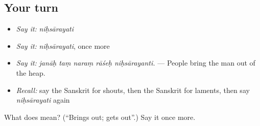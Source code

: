 \subsection*{Your turn}
\begin{itemize}
\raggedright
  \item \emph{Say it:} \emph{niḥsārayati}
  \item \emph{Say it:} \emph{niḥsārayati}, once more
  \item \emph{Say it:} \emph{janāḥ taṃ naraṃ rāśeḥ niḥsārayanti.} — People bring the man out of the heap.
  \item \emph{Recall:} say the Sanskrit for shouts, then the Sanskrit for laments, then say \emph{niḥsārayati} again
\end{itemize}

\begin{tcolorbox}[breakable,colback=teal!4,colframe=teal!35!black,title={Before you move on}]
What does  mean? (\textquotedblleft{}Brings out; gets out\textquotedblright{}.) Say it once more.
\end{tcolorbox}
